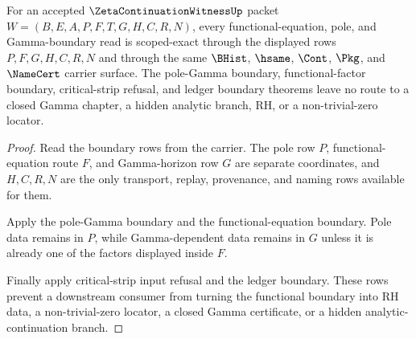 \begin{theorem}
\label{thm:zeta-continuation-witness-functional-boundary-scoped-exactness}
For an accepted $\ZetaContinuationWitnessUp$ packet $W=(B,E,A,P,F,T,G,H,C,R,N)$, every functional-equation, pole, and Gamma-boundary read is scoped-exact through the displayed rows $P,F,G,H,C,R,N$ and through the same $\BHist$, $\hsame$, $\Cont$, $\Pkg$, and $\NameCert$ carrier surface. The pole-Gamma boundary, functional-factor boundary, critical-strip refusal, and ledger boundary theorems leave no route to a closed Gamma chapter, a hidden analytic branch, RH, or a non-trivial-zero locator.
\end{theorem}
\begin{proof}
Read the boundary rows from the carrier. The pole row $P$, functional-equation route $F$, and Gamma-horizon row $G$ are separate coordinates, and $H,C,R,N$ are the only transport, replay, provenance, and naming rows available for them.

Apply the pole-Gamma boundary and the functional-equation boundary. Pole data remains in $P$, while Gamma-dependent data remains in $G$ unless it is already one of the factors displayed inside $F$.

Finally apply critical-strip input refusal and the ledger boundary. These rows prevent a downstream consumer from turning the functional boundary into RH data, a non-trivial-zero locator, a closed Gamma certificate, or a hidden analytic-continuation branch.
\end{proof}


